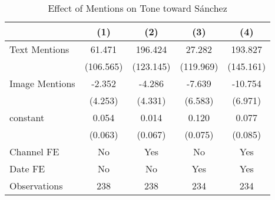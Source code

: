 \begin{table}[htbp]\centering
\def\sym#1{\ifmmode^{#1}\else\(^{#1}\)\fi}
\caption{Effect of Mentions on Tone toward Sánchez}
\begin{tabular}{l*{4}{c}}
\hline\hline
                &\multicolumn{1}{c}{(1)}         &\multicolumn{1}{c}{(2)}         &\multicolumn{1}{c}{(3)}         &\multicolumn{1}{c}{(4)}         \\
\hline
Text Mentions   &   61.471         &  196.424         &   27.282         &  193.827         \\
                &(106.565)         &(123.145)         &(119.969)         &(145.161)         \\
Image Mentions  &   -2.352         &   -4.286         &   -7.639         &  -10.754         \\
                &  (4.253)         &  (4.331)         &  (6.583)         &  (6.971)         \\
constant          &    0.054         &    0.014         &    0.120         &    0.077         \\
                &  (0.063)         &  (0.067)         &  (0.075)         &  (0.085)         \\
Channel FE      &       No         &      Yes         &       No         &      Yes         \\
Date FE         &       No         &       No         &      Yes         &      Yes         \\
\hline
Observations    &      238         &      238         &      234         &      234         \\
\hline\hline
\end{tabular}
\end{table}

